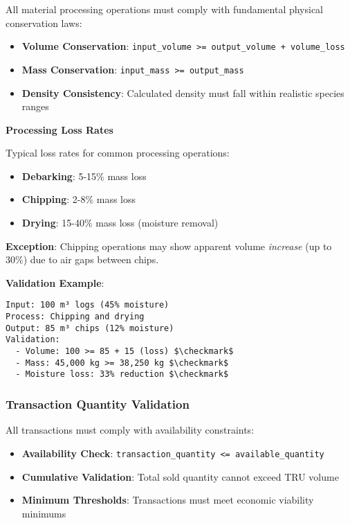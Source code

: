 All material processing operations must comply with fundamental physical conservation laws:

\begin{itemize}
    \item \textbf{Volume Conservation}: \texttt{input\_volume >= output\_volume + volume\_loss}
    \item \textbf{Mass Conservation}: \texttt{input\_mass >= output\_mass}
    \item \textbf{Density Consistency}: Calculated density must fall within realistic species ranges
\end{itemize}

\textbf{Processing Loss Rates}

Typical loss rates for common processing operations:
\begin{itemize}
    \item \textbf{Debarking}: 5-15\% mass loss
    \item \textbf{Chipping}: 2-8\% mass loss
    \item \textbf{Drying}: 15-40\% mass loss (moisture removal)
\end{itemize}

\textbf{Exception}: Chipping operations may show apparent volume \emph{increase} (up to 30\%) due to air gaps between chips.

\textbf{Validation Example}:
\begin{verbatim}
Input: 100 m³ logs (45% moisture)
Process: Chipping and drying
Output: 85 m³ chips (12% moisture)
Validation: 
  - Volume: 100 >= 85 + 15 (loss) $\checkmark$
  - Mass: 45,000 kg >= 38,250 kg $\checkmark$
  - Moisture loss: 33% reduction $\checkmark$
\end{verbatim}

\subsubsection{Transaction Quantity Validation}

All transactions must comply with availability constraints:

\begin{itemize}
    \item \textbf{Availability Check}: \texttt{transaction\_quantity <= available\_quantity}
    \item \textbf{Cumulative Validation}: Total sold quantity cannot exceed TRU volume
    \item \textbf{Minimum Thresholds}: Transactions must meet economic viability minimums
\end{itemize}

